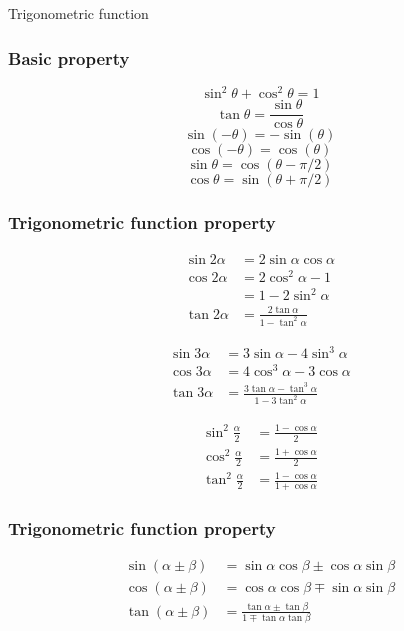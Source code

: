 \documentclass[9pt]{beamer}
\begin{document}
    \begin{section}{Trigonometric function}
        \begin{frame}
            \frametitle{Basic property}
            $$ \sin^2 \theta + \cos ^2  \theta= 1$$
            $$\tan \theta = \frac{\sin \theta}{ \cos \theta}$$
            $$ \sin (-\theta) = - \sin (\theta)$$
            $$ \cos (-\theta) =  \cos (\theta)$$
            $$ \sin \theta = \cos (\theta - \pi/2)$$
            $$ \cos \theta = \sin (\theta + \pi/2)$$
        
            
        
        \end{frame}
        \begin{frame}
            \frametitle{Trigonometric function property}
            \small
            \begin{align*}  \sin 2\alpha &= 2\sin\alpha\cos \alpha \\ \cos 2\alpha &= 2 \cos^2 \alpha -1 \\ &= 1-2\sin^2 \alpha  \\ \tan 2\alpha &= \frac{2\tan \alpha}{1- \tan^2 \alpha} \end{align*}
            
            \begin{align*}  \sin 3\alpha &= 3\sin\alpha - 4\sin^3 \alpha \\ \cos 3\alpha &=  4\cos^3 \alpha -3\cos \alpha  \\ \tan3 \alpha &= \frac{3\tan \alpha - \tan^3 \alpha}{1- 3\tan^2 \alpha} \end{align*}
            
            \begin{align*}  \sin^2 \frac{\alpha}{2} &= \frac{1-\cos \alpha}{2} \\ \cos^2 \frac{\alpha}{2} &= \frac{1+\cos \alpha}{2} \\ \tan^2 \frac{\alpha}{2} &= \frac{1-\cos \alpha}{1+ \cos \alpha} \end{align*}
        \end{frame}
        
        \begin{frame}
            \frametitle{Trigonometric function property}
            \small
            \begin{align*} \sin(\alpha \pm \beta) &= \sin \alpha \cos \beta \pm  \cos \alpha \sin \beta\\\cos(\alpha \pm \beta) &= \cos \alpha \cos \beta \mp \sin \alpha \sin \beta \\ \tan(\alpha \pm \beta) &= \frac{\tan\alpha \pm \tan \beta}{1 \mp \tan \alpha \tan \beta}\end{align*}
                

\end{frame}
\end{section}
\end{document}
